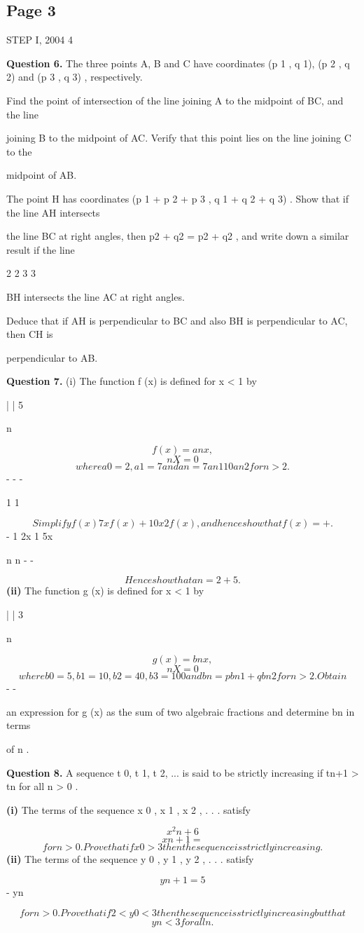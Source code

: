 \documentclass[12pt]{article}
\begin{document}
\subsection*{Page 3}
\begin{flushleft}
STEP I, 2004 4\par
\bigskip\textbf{Question 6.} The three points A, B and C have coordinates (p 1 , q 1), (p 2 , q 2) and (p 3 , q 3) , respectively.\par
Find the point of intersection of the line joining A to the midpoint of BC, and the line\par
joining B to the midpoint of AC. Verify that this point lies on the line joining C to the\par
midpoint of AB.\par
The point H has coordinates (p 1 + p 2 + p 3 , q 1 + q 2 + q 3) . Show that if the line AH intersects\par
the line BC at right angles, then p2 + q2 = p2 + q2 , and write down a similar result if the line\par
2 2 3 3\par
BH intersects the line AC at right angles.\par
Deduce that if AH is perpendicular to BC and also BH is perpendicular to AC, then CH is\par
perpendicular to AB.\par
\bigskip\textbf{Question 7.} (i) The function f (x) is defined for x < 1 by\par
| | 5\par
\infty n\par
\[f (x) = anx ,\]
\[nX=0\]
\[where a 0 = 2, a 1 = 7 and an = 7an 1 10an 2 for n > 2 .\]
- - -\par
1 1\par
\[Simplify f (x) 7xf (x) + 10x2f (x) , and hence show that f (x) = + .\]
- 1 2x 1 5x\par
n n - -\par
\[Hence show that an = 2 + 5 .\]
\textbf{(ii)} The function g (x) is defined for x < 1 by\par
| | 3\par
\infty n\par
\[g (x) = bnx ,\]
\[nX=0\]
\[where b 0 = 5 , b 1 = 10 , b 2 = 40 , b 3 = 100 and bn = pbn 1 + qbn 2 for n > 2 . Obtain\]
- -\par
an expression for g (x) as the sum of two algebraic fractions and determine bn in terms\par
of n .\par
\bigskip\textbf{Question 8.} A sequence t 0, t 1, t 2, ... is said to be strictly increasing if tn+1 > tn for all n > 0 .\par
\textbf{(i)} The terms of the sequence x 0 , x 1 , x 2 , . . . satisfy\par
\[x^2 n + 6\]
\[xn+1 =\]
\[for n > 0 . Prove that if x 0 > 3 then the sequence is strictly increasing.\]
\textbf{(ii)} The terms of the sequence y 0 , y 1 , y 2 , . . . satisfy\par
\[yn+1 = 5\]
- yn\par
\[for n > 0 . Prove that if 2 < y 0 < 3 then the sequence is strictly increasing but that\]
\[yn < 3 for all n .\]
\end{flushleft}
\end{document}

